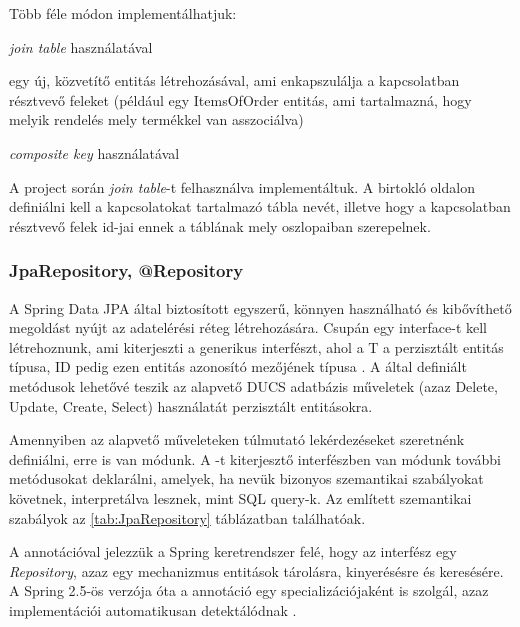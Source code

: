 Több féle módon implementálhatjuk: 

\begin{listing}
	\item \emph{join table} használatával
	\item egy új, közvetítő entitás létrehozásával, ami enkapszulálja a kapcsolatban résztvevő feleket (például egy ItemsOfOrder entitás, ami tartalmazná, hogy melyik rendelés mely termékkel van asszociálva)
	\item \emph{composite key} használatával
\end{listing}

A project során \emph{join table}-t felhasználva implementáltuk. A birtokló oldalon definiálni kell a kapcsolatokat tartalmazó tábla nevét, illetve hogy a kapcsolatban résztvevő felek id-jai ennek a táblának mely oszlopaiban szerepelnek. \par


\subsubsection{JpaRepository, @Repository}

A Spring Data JPA által biztosított  egyszerű, könnyen használható és kibővíthető megoldást nyújt az adatelérési réteg létrehozására. Csupán egy interface-t kell létrehoznunk, ami kiterjeszti a  generikus interfészt, ahol a T a perzisztált entitás típusa, ID pedig ezen entitás azonosító mezőjének típusa \cite{jpaRepositoryDocumentation}. A  által definiált metódusok lehetővé teszik az alapvető  DUCS adatbázis műveletek (azaz Delete, Update, Create, Select) használatát perzisztált entitásokra. \par

Amennyiben az alapvető műveleteken túlmutató lekérdezéseket szeretnénk definiálni, erre is van módunk. A -t kiterjesztő interfészben van módunk további metódusokat deklarálni, amelyek, ha nevük bizonyos szemantikai szabályokat követnek, interpretálva lesznek, mint SQL query-k. Az említett szemantikai szabályok az \ref{tab:JpaRepository} táblázatban találhatóak. \par

A  annotációval jelezzük a Spring keretrendszer felé, hogy az interfész egy \emph{Repository}, azaz egy mechanizmus entitások tárolásra, kinyerésésre és keresésére. A Spring 2.5-ös verzója óta a  annotáció egy specializációjaként is szolgál, azaz implementációi automatikusan detektálódnak \cite{repositoryDocumentation}.

